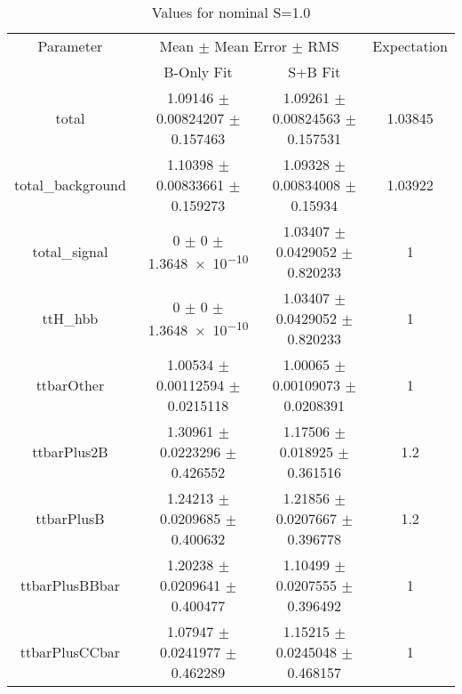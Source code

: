 \begin{table}
\centering
\caption{Values for nominal S=1.0}
\begin{tabular}{cccc}
\toprule
Parameter & \multicolumn{2}{c}{Mean $\pm$ Mean Error $\pm$ RMS} & Expectation\\
 & B-Only Fit & S+B Fit & \\
\midrule
total & \num{1.09146} $\pm$ \num{0.00824207} $\pm$ \num{0.157463} & \num{1.09261} $\pm$ \num{0.00824563} $\pm$ \num{0.157531} & \num{1.03845}\\
total\_background & \num{1.10398} $\pm$ \num{0.00833661} $\pm$ \num{0.159273} & \num{1.09328} $\pm$ \num{0.00834008} $\pm$ \num{0.15934} & \num{1.03922}\\
total\_signal & \num{0} $\pm$ \num{0} $\pm$ \num{1.3648e-10} & \num{1.03407} $\pm$ \num{0.0429052} $\pm$ \num{0.820233} & \num{1}\\
ttH\_hbb & \num{0} $\pm$ \num{0} $\pm$ \num{1.3648e-10} & \num{1.03407} $\pm$ \num{0.0429052} $\pm$ \num{0.820233} & \num{1}\\
ttbarOther & \num{1.00534} $\pm$ \num{0.00112594} $\pm$ \num{0.0215118} & \num{1.00065} $\pm$ \num{0.00109073} $\pm$ \num{0.0208391} & \num{1}\\
ttbarPlus2B & \num{1.30961} $\pm$ \num{0.0223296} $\pm$ \num{0.426552} & \num{1.17506} $\pm$ \num{0.018925} $\pm$ \num{0.361516} & \num{1.2}\\
ttbarPlusB & \num{1.24213} $\pm$ \num{0.0209685} $\pm$ \num{0.400632} & \num{1.21856} $\pm$ \num{0.0207667} $\pm$ \num{0.396778} & \num{1.2}\\
ttbarPlusBBbar & \num{1.20238} $\pm$ \num{0.0209641} $\pm$ \num{0.400477} & \num{1.10499} $\pm$ \num{0.0207555} $\pm$ \num{0.396492} & \num{1}\\
ttbarPlusCCbar & \num{1.07947} $\pm$ \num{0.0241977} $\pm$ \num{0.462289} & \num{1.15215} $\pm$ \num{0.0245048} $\pm$ \num{0.468157} & \num{1}\\
\bottomrule
\end{tabular}
\end{table}